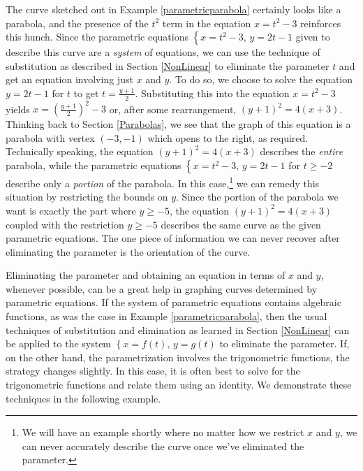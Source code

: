The curve sketched out in Example \ref{parametricparabola} certainly looks like a parabola, and the presence of the $t^2$ term in the equation $x=t^2-3$ reinforces this hunch.  Since the parametric equations $\left\{ x = t^2 - 3, \, y = 2t-1 \right.$ given to describe this curve are a \textit{system} of equations, we can use the technique of substitution as described in Section \ref{NonLinear} to eliminate the parameter $t$ and get an equation involving just $x$ and $y$.  To do so, we choose to solve the equation $y = 2t-1$ for $t$ to get $t = \frac{y+1}{2}$.  Substituting this into the equation $x = t^2 -3$ yields $x = \left(\frac{y+1}{2}\right)^2 - 3$ or, after some rearrangement, $(y+1)^2 = 4(x+3)$. Thinking back to Section \ref{Parabolas}, we see that the graph of this equation is a parabola with vertex $(-3,-1)$ which opens to the right, as required. Technically speaking, the equation $(y+1)^2 = 4(x+3)$ describes the \textit{entire} parabola, while the parametric equations $\left\{ x = t^2 - 3, \, y = 2t-1 \right.$ for $t \geq -2$ describe only a \textit{portion} of the parabola.  In this case,\footnote{We will have an example shortly where no matter how we restrict $x$ and $y$, we can never accurately describe the curve once we've eliminated the parameter.} we can remedy this situation by restricting the bounds on $y$.  Since the portion of the parabola we want is exactly the part where $y \geq -5$, the equation $(y+1)^2 = 4(x+3)$ coupled with the restriction $y \geq -5$ describes the same curve as the given parametric equations.  The one piece of information we can never recover after eliminating the parameter is the orientation of the curve.

\smallskip

Eliminating the parameter and obtaining an equation in terms of $x$ and $y$, whenever possible, can be a great help in graphing curves determined by parametric equations. If the system of parametric equations contains algebraic functions, as was the case in  Example \ref{parametricparabola}, then the usual techniques of substitution and elimination as learned  in Section \ref{NonLinear} can be applied to the system $\left\{ x = f(t), \, y = g(t) \right.$ to eliminate the parameter.  If, on the other hand, the parametrization involves the trigonometric functions, the strategy changes slightly.  In this case, it is often best to solve for the trigonometric functions and relate them using an identity.  We demonstrate these techniques in the following example.

